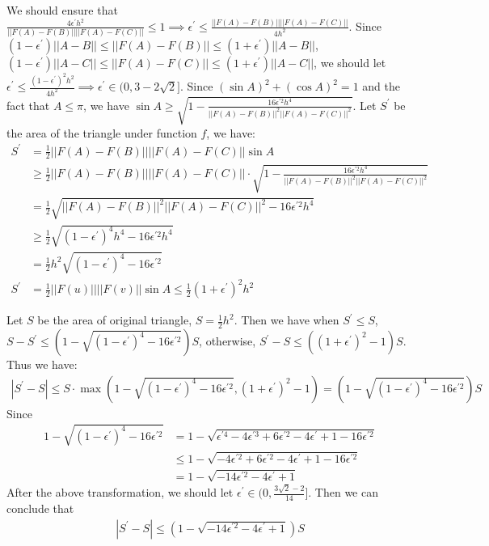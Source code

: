 We should ensure that $\frac{4\epsilon^{\prime}h^2}{||F(A)-F(B)||||F(A)-F(C)||}\le1 \implies \epsilon^{\prime} \le \frac{||F(A)-F(B)||||F(A)-F(C)||}{4h^2}$.
Since $(1-\epsilon^{\prime}) ||A-B||\le||F(A)-F(B)||\le (1+\epsilon^{\prime}) ||A-B||$, $(1-\epsilon^{\prime}) ||A-C||\le||F(A)-F(C)||\le (1+\epsilon^{\prime}) ||A-C||$,
we should let $ \epsilon^{\prime} \le \frac{(1-\epsilon^{\prime})^2h^2}{4h^2}\implies \epsilon^{\prime} \in (0,3-2\sqrt{2}]$.
Since $(\sin A)^2+(\cos A)^2=1$ and the fact that $A\le\pi$, we have $\sin A \ge \sqrt{1- \frac{16\epsilon^{\prime 2}h^4}{||F(A)-F(B)||^2||F(A)-F(C)||^2}}$.
Let $S^{\prime}$ be the area of the triangle under function $f$, we have:
\begin{align}
    \nonumber S^{\prime}&=\frac{1}{2}||F(A)-F(B)||||F(A)-F(C)||\sin A \\
    \nonumber &\ge \frac{1}{2}||F(A)-F(B)||||F(A)-F(C)||\cdot \sqrt{1- \frac{16\epsilon^{\prime 2}h^4}{||F(A)-F(B)||^2||F(A)-F(C)||^2}}\\
    \nonumber &=\frac{1}{2}\sqrt{||F(A)-F(B)||^2||F(A)-F(C)||^2-16\epsilon^{\prime 2}h^4}\\
    \nonumber &\ge \frac{1}{2}\sqrt{(1-\epsilon^{\prime})^4h^4-16\epsilon^{\prime 2}h^4}\\
    \nonumber &=\frac{1}{2}h^2\sqrt{(1-\epsilon^{\prime})^4-16\epsilon^{\prime 2}}\\
    \nonumber S^{\prime}&=\frac{1}{2}||F(u)||||F(v)||\sin A \le \frac{1}{2}(1+\epsilon^{\prime})^2h^2
\end{align}

Let $S$ be the area of original triangle, $S=\frac{1}{2}h^2$.
Then we have 
when $S^{\prime}\le S$, $S-S^{\prime}\le (1-\sqrt{(1-\epsilon^{\prime})^4-16\epsilon^{\prime 2}})S$,
otherwise, $S^{\prime}-S \le ((1+\epsilon^{\prime})^2-1)S$.
Thus we have:
\begin{align}
    \nonumber |S^{\prime}-S|\le S \cdot \max(1-\sqrt{(1-\epsilon^{\prime})^4-16\epsilon^{\prime 2}}, (1+\epsilon^{\prime})^2-1)=(1-\sqrt{(1-\epsilon^{\prime})^4-16\epsilon^{\prime 2}})S
\end{align}
Since 
\begin{align}
    \nonumber 1-\sqrt{(1-\epsilon^{\prime})^4-16\epsilon^{\prime 2}} 
    &= 1-\sqrt{\epsilon^{\prime 4}-4\epsilon^{\prime 3}+6\epsilon^{\prime 2}-4\epsilon^{\prime}+1-16\epsilon^{\prime 2}}\\
    \nonumber &\le 1-\sqrt{-4\epsilon^{\prime 2}+6\epsilon^{\prime 2}-4\epsilon^{\prime}+1-16\epsilon^{\prime 2}}\\
    \nonumber &= 1-\sqrt{-14\epsilon^{\prime 2}-4\epsilon^{\prime}+1}
\end{align}
After the above transformation, we should let $\epsilon^{\prime} \in (0,\frac{3\sqrt{2}-2}{14}]$.
Then we can conclude that 
\begin{align}
    \nonumber |S^{\prime}-S|\le (1-\sqrt{-14\epsilon^{\prime 2}-4\epsilon^{\prime}+1})S
\end{align}


